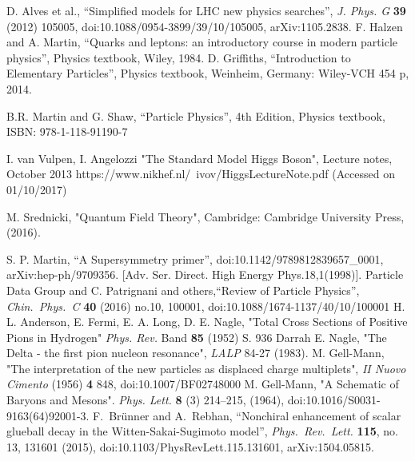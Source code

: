 \begin{thebibliography}{9}
D. Alves et al., “Simplified models for LHC new physics searches”, {\it J. Phys. G} {\bf 39} (2012) 105005, doi:10.1088/0954-3899/39/10/105005, arXiv:1105.2838.
  F. Halzen and A. Martin,
  ``Quarks and leptons: an introductory course in modern particle physics'', Physics textbook,
  Wiley, 1984.
  D. Griffiths, ``Introduction to Elementary Particles'', Physics textbook, 
  Weinheim, Germany: Wiley-VCH 454 p, 2014.

  B.R. Martin and G. Shaw,
  ``Particle Physics'', 4th Edition, Physics textbook, ISBN: 978-1-118-91190-7

I. van Vulpen, I. Angelozzi
"The Standard Model Higgs Boson",
Lecture notes, October 2013 
https://www.nikhef.nl/~ivov/HiggsLectureNote.pdf (Accessed on 01/10/2017)

M. Srednicki, "Quantum Field Theory", 
Cambridge: Cambridge University Press, (2016).

S. P. Martin, 
“A Supersymmetry primer”, 
doi:10.1142/9789812839657\_0001,
arXiv:hep-ph/9709356. [Adv. Ser. Direct. High Energy Phys.18,1(1998)].
{Particle Data Group} and C. Patrignani and others,``Review of Particle Physics'', {\it Chin.\ Phys.\ C} {\bf 40} (2016) no.10,  100001, doi:10.1088/1674-1137/40/10/100001
H. L. Anderson, E. Fermi, E. A. Long, D. E. Nagle, "Total Cross Sections of Positive Pions in Hydrogen" {\it Phys. Rev.} Band {\bf 85} (1952) S. 936
Darrah E. Nagle, "The Delta - the first pion nucleon resonance", {\it LALP} 84-27 (1983).
  M. Gell-Mann, "The interpretation of the new particles as displaced charge multiplets", { \it II Nuovo Cimento} (1956) {\bf 4} 848,  doi:10.1007/BF02748000
M. Gell-Mann, "A Schematic of Baryons and Mesons". {\it Phys. Lett.} {\bf 8} (3) 214–215, (1964), doi:10.1016/S0031-9163(64)92001-3.
 F.~Brünner and A.~Rebhan, ``Nonchiral enhancement of scalar glueball decay in the Witten-Sakai-Sugimoto model'',
  {\it Phys.\ Rev.\ Lett.}  {\bf 115}, no. 13, 131601 (2015), doi:10.1103/PhysRevLett.115.131601, arXiv:1504.05815.
  

\end{thebibliography}
